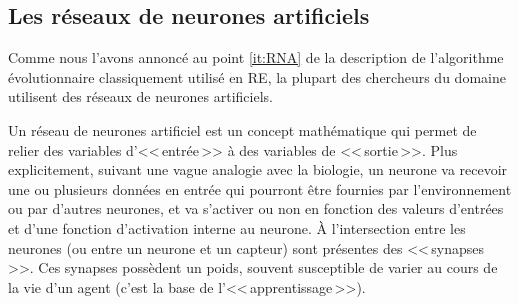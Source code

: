 \subsection{Les réseaux de neurones artificiels}\label{sec:RNA}

Comme nous l'avons annoncé au point \ref{it:RNA} de la description de l'algorithme évolutionnaire classiquement utilisé en RE, la plupart des chercheurs du domaine utilisent des réseaux de neurones artificiels.

Un réseau de neurones artificiel est un concept mathématique qui permet de relier des variables d'<<\,entrée\,>> à des variables de <<\,sortie\,>>. Plus explicitement, suivant une vague analogie avec la biologie, un neurone va recevoir une ou plusieurs données en entrée qui pourront être fournies par l'environnement ou par d'autres neurones, et va s'activer ou non en fonction des valeurs d'entrées et d'une fonction d'activation interne au neurone. À l'intersection entre les neurones (ou entre un neurone et un capteur) sont présentes des <<\,synapses\,>>. Ces synapses possèdent un poids, souvent susceptible de varier au cours de la vie d'un agent (c'est la base de l'<<\,apprentissage\,>>).

